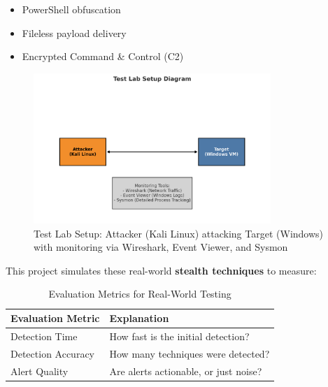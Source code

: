 \begin{itemize}
    \item PowerShell obfuscation
    \item Fileless payload delivery
    \item Encrypted Command \& Control (C2)
\end{itemize}

\begin{figure}[H]
    \centering
    \includegraphics[width=0.8\textwidth]{Pictures/test_lab_env.png}
    \caption{Test Lab Setup: Attacker (Kali Linux) attacking Target (Windows) with monitoring via Wireshark, Event Viewer, and Sysmon}
    \label{fig:test_lab_setup}
\end{figure}

This project simulates these real-world \textbf{stealth techniques} to measure:

\begin{table}[H]
    \centering
    \begin{tabular}{|l|l|}
        \hline
        \textbf{Evaluation Metric} & \textbf{Explanation} \\
        \hline
        Detection Time & How fast is the initial detection? \\
        Detection Accuracy & How many techniques were detected? \\
        Alert Quality & Are alerts actionable, or just noise? \\
        \hline
    \end{tabular}
    \caption{Evaluation Metrics for Real-World Testing}
\end{table}
